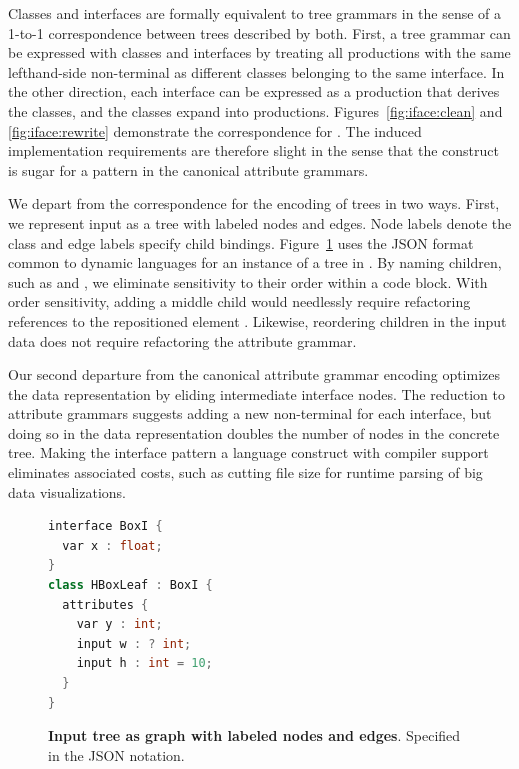 Classes and interfaces are formally equivalent to tree grammars in the sense of a 1-to-1 correspondence between trees described by both. First, a tree grammar can be expressed with classes and interfaces by treating all productions with the same lefthand-side non-terminal as different classes belonging to the same interface. In the other direction, each interface can be expressed as a production that derives the classes, and the classes expand into productions. Figures~\ref{fig:iface:clean} and \ref{fig:iface:rewrite} demonstrate the correspondence for \hlang. The induced implementation requirements are therefore slight in the sense that the construct is sugar for a pattern in the canonical attribute grammars. 

We depart from the correspondence for the encoding of trees in two ways. First, we represent input as a tree with labeled nodes and edges. Node labels denote the class and edge labels specify child bindings. Figure~\ref{fig:hboxjson} uses the JSON format common to dynamic languages for an instance of a tree in \hlang. By naming children, such as  and , we eliminate sensitivity to their order within a code block. With order sensitivity, adding a middle child  would needlessly require refactoring references to the repositioned element . Likewise, reordering children in the input data does not require refactoring the attribute grammar.

Our second departure from the canonical attribute grammar encoding optimizes the data representation by eliding intermediate interface nodes. The reduction to attribute grammars suggests adding a new non-terminal for each interface, but doing so in the data representation doubles the number of nodes in the concrete tree. Making the interface pattern a language construct with compiler support eliminates associated costs, such as cutting file size for runtime parsing of big data visualizations.

\begin{figure}
\begin{lstlisting}[language=C++,morekeywords={interface,class,var,input,int,float}]
interface BoxI {
  var x : float;
}
class HBoxLeaf : BoxI {
  attributes {
    var y : int;
    input w : ? int;
    input h : int = 10;
  }
}


\end{lstlisting}
\caption{\textbf{Input tree as graph with labeled nodes and edges}. Specified in the JSON notation.}
\label{fig:hboxjson}
\end{figure}


